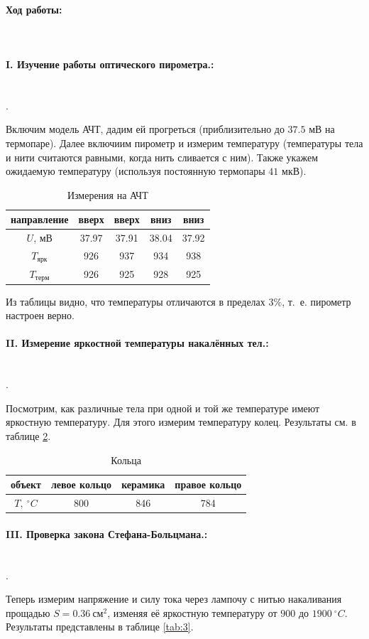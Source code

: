 \documentclass[a4paper, 12pt]{article}
\newcommand{\parag}[1]{\paragraph*{#1:}}
\newcounter{Points}
\newcommand{\point}{\arabic{Points}. \addtocounter{Points}{1}}
\begin{document}
\parag {Ход работы} ~\\

\parag {I. Изучение работы оптического пирометра.} ~\\

\point Включим модель АЧТ, дадим ей прогреться (приблизительно до $37.5$ мВ на термопаре). Далее включиим пирометр и измерим температуру (температуры тела и нити считаются равными, когда нить сливается с ним). Также укажем ожидаемую температуру (используя постоянную термопары $41$ мкВ).

\begin{table}[!h]
    \centering
    \begin{tabular}{|c|c|c|c|c|}
        \hline
        направление & вверх & вверх & вниз & вниз \\ \hline
        $U$, мВ & 37.97 & 37.91 & 38.04 & 37.92 \\ \hline
        $T_{ярк}$  & 926 & 937 & 934 & 938 \\ \hline
        $T_{терм}$ & 926 & 925 & 928 & 925 \\ \hline
    \end{tabular}
    \caption {Измерения на АЧТ}
    \label{tab:1}
\end{table}

Из таблицы видно, что температуры отличаются в пределах $3\%$, т.~е. пирометр настроен верно. 

\newpage

\parag {II. Измерение яркостной температуры накалённых тел.} ~\\

\point Посмотрим, как различные тела при одной и той же температуре имеют яркостную температуру. Для этого измерим температуру колец. Результаты см. в таблице \ref{tab:2}.

\begin{table}[!h]
    \centering
    \begin{tabular}{|c|c|c|c|}
        \hline
        объект & левое кольцо & керамика & правое кольцо \\ \hline
        $T, ~^\circ C$ & 800 & 846 & 784 \\ \hline
    \end{tabular}
    \caption {Кольца}
    \label{tab:2}
\end{table}

\newpage

\parag {III. Проверка закона Стефана-Больцмана.} ~\\

\point Теперь измерим напряжение и силу тока через лампочу с нитью накаливания прощадью $S = 0.36 ~ см^2$, изменяя её яркостную температуру от $900$ до $1900 ~^\circ C$. Результаты представлены в таблице \ref{tab:3}.
\end{document}
